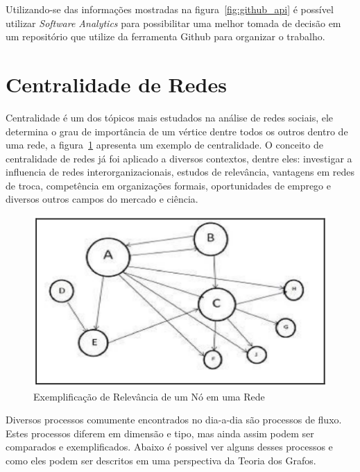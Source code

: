 Utilizando-se das informações mostradas na figura~\ref{fig:github_api} é possível utilizar
\textit{Software Analytics} para possibilitar uma melhor tomada de decisão em um
repositório que utilize da ferramenta Github para organizar o trabalho.

\section{Centralidade de Redes}

Centralidade é um dos tópicos mais estudados na análise de redes sociais, ele 
determina o grau de importância de um vértice dentre todos os outros dentro de uma 
rede, a figura~\ref{fig:centrality} apresenta um exemplo de centralidade. 
O conceito de centralidade de redes já foi aplicado a diversos contextos, dentre eles: investigar a influencia 
de redes interorganizacionais, estudos de relevância, vantagens em redes de troca, 
competência em organizações formais, oportunidades de emprego e diversos outros campos 
do mercado e ciência\cite{centrality}.

\begin{figure}[h]
    \centering
    \label{fig:centrality}
        \includegraphics[keepaspectratio=true,scale=0.5]{figuras/centrality.eps}
    \caption{Exemplificação de Relevância de um Nó em uma Rede}
\end{figure}

Diversos processos comumente encontrados no dia-a-dia são processos de fluxo. Estes
processos diferem em dimensão e tipo, mas ainda assim podem ser comparados e exemplificados.
Abaixo é possivel ver alguns desses processos e como eles podem ser descritos em uma perspectiva
da Teoria dos Grafos\cite{ceflow}.  

